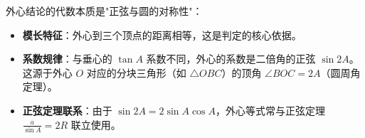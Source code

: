 \begin{explanationbox}
外心结论的代数本质是"正弦与圆的对称性"：
\begin{itemize}
    \item \textbf{模长特征}：外心到三个顶点的距离相等，这是判定的核心依据。
    \item \textbf{系数规律}：与垂心的 $\tan A$ 系数不同，外心的系数是二倍角的正弦 $\sin 2A$。这源于外心 $O$ 对应的分块三角形（如 $\triangle OBC$）的顶角 $\angle BOC = 2A$（圆周角定理）。
    \item \textbf{正弦定理联系}：由于 $\sin 2A = 2\sin A \cos A$，外心等式常与正弦定理 $\frac{a}{\sin A} = 2R$ 联立使用。
\end{itemize}
\end{explanationbox}
